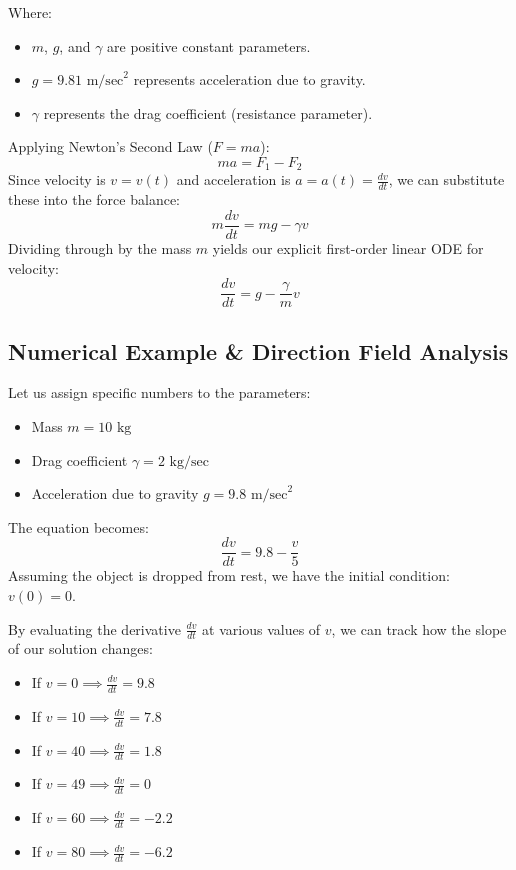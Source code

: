 \documentclass[11pt]{article}
\begin{document}
Where:
\begin{itemize}
    \item $m$, $g$, and $\gamma$ are positive constant parameters.
    \item $g = 9.81 \text{ m/sec}^2$ represents acceleration due to gravity.
    \item $\gamma$ represents the drag coefficient (resistance parameter).
\end{itemize}

Applying Newton's Second Law ($F = ma$):
\[
  ma = F_1 - F_2
\]
Since velocity is $v = v(t)$ and acceleration is $a = a(t) = \frac{dv}{dt}$, we can substitute these into the force balance:
\[
  m \frac{dv}{dt} = mg - \gamma v
\]
Dividing through by the mass $m$ yields our explicit first-order linear ODE for velocity:
\[
  \frac{dv}{dt} = g - \frac{\gamma}{m}v
\]

\subsection{Numerical Example \& Direction Field Analysis}
Let us assign specific numbers to the parameters:
\begin{itemize}
    \item Mass $m = 10 \text{ kg}$
    \item Drag coefficient $\gamma = 2 \text{ kg/sec}$
    \item Acceleration due to gravity $g = 9.8 \text{ m/sec}^2$
\end{itemize}

The equation becomes:
\[
  \frac{dv}{dt} = 9.8 - \frac{v}{5}
\]
Assuming the object is dropped from rest, we have the initial condition: $v(0) = 0$.

By evaluating the derivative $\frac{dv}{dt}$ at various values of $v$, we can track how the slope of our solution changes:
\begin{itemize}
    \item If $v = 0 \implies \frac{dv}{dt} = 9.8$
    \item If $v = 10 \implies \frac{dv}{dt} = 7.8$
    \item If $v = 40 \implies \frac{dv}{dt} = 1.8$
    \item If $v = 49 \implies \frac{dv}{dt} = 0$
    \item If $v = 60 \implies \frac{dv}{dt} = -2.2$
    \item If $v = 80 \implies \frac{dv}{dt} = -6.2$
\end{itemize}
\end{document}
